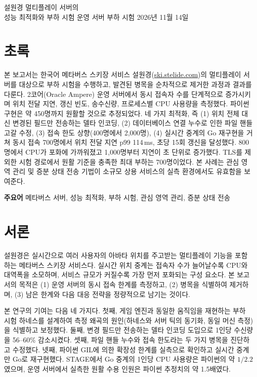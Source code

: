 \documentclass[11pt,a4paper]{article}
\begin{document}
  {설원경 멀티플레이 서버의\\성능 최적화와 부하 시험}
  {운영 서버 부하 시험 \enspace\textbar\enspace 2026년 11월 14일}

\section*{초록}
본 보고서는 한국어 메타버스 스키장 서비스 설원경(\href{https://ski.stelide.com}{ski.stelide.com})의 멀티플레이 서버를 대상으로 부하 시험을 수행하고, 발견된 병목을 순차적으로 제거한 과정과 결과를 다룬다. 2코어(Oracle Ampere) 운영 서버에서 동시 접속자 수를 단계적으로 증가시키며 위치 전달 지연, 갱신 빈도, 송수신량, 프로세스별 CPU 사용량을 측정했다. 파이썬 구현은 약 450명까지 원활할 것으로 추정되었다. 네 가지 최적화, 즉 (1) 위치 전체 대신 변경된 필드만 전송하는 델타 인코딩, (2) 데이터베이스 연결 누수로 인한 파일 핸들 고갈 수정, (3) 접속 한도 상향(400명에서 2,000명), (4) 실시간 중계의 Go 재구현을 거쳐 동시 접속 700명에서 위치 전달 지연 p99 114\,ms, 초당 15회 갱신을 달성했다. 800명에서 CPU가 포화에 가까워졌고 1,000명부터 지연이 초 단위로 증가했다. TLS를 제외한 시험 경로에서 원활 기준을 충족한 최대 부하는 700명이었다. 본 사례는 관심 영역 관리 및 증분 상태 전송 기법이 소규모 상용 서비스의 실측 환경에서도 유효함을 보여준다.

{\small\textbf{주요어} \quad 메타버스 서버, 성능 최적화, 부하 시험, 관심 영역 관리, 증분 상태 전송}

\section{서론}
설원경은 실시간으로 여러 사용자의 아바타 위치를 주고받는 멀티플레이 기능을 포함하는 메타버스 스키장 서비스다. 실시간 위치 중계는 접속자 수가 늘어날수록 CPU와 대역폭을 소모하며, 서비스 규모가 커질수록 가장 먼저 포화되는 구성 요소다. 본 보고서의 목적은 (1) 운영 서버의 동시 접속 한계를 측정하고, (2) 병목을 식별하여 제거하며, (3) 남은 한계와 다음 대응 전략을 정량적으로 남기는 것이다.

본 연구의 기여는 다음 네 가지다. 첫째, 게임 엔진과 동일한 움직임을 재현하는 부하 시험 하네스를 설계하여 측정 왜곡의 원인(하네스와 서버 틱의 동기화, 동일 머신 측정)을 식별하고 보정했다. 둘째, 변경 필드만 전송하는 델타 인코딩 도입으로 1인당 수신량을 56--60\% 감소시켰다. 셋째, 파일 핸들 누수와 접속 한도라는 두 가지 병목을 진단하고 수정했다. 넷째, 파이썬 GIL에 의한 확장성 한계를 실측으로 확인하고 실시간 중계만 Go로 재구현했다. STAGE에서 Go 중계의 1인당 CPU 사용량은 파이썬의 약 \(1/2.2\)였으며, 운영 서버에서 실측한 원활 수용 인원은 파이썬 추정치의 약 1.5배였다.
\end{document}
